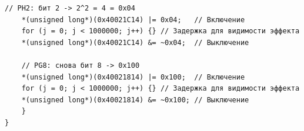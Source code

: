 \begin{lstlisting}[style=cstyle, caption={Основная функция программы}]
    // PH2: бит 2 -> 2^2 = 4 = 0x04
    *(unsigned long*)(0x40021C14) |= 0x04;   // Включение
    for (j = 0; j < 1000000; j++) {} // Задержка для видимости эффекта
    *(unsigned long*)(0x40021C14) &= ~0x04;  // Выключение

    // PG8: снова бит 8 -> 0x100
    *(unsigned long*)(0x40021814) |= 0x100;  // Включение
    for (j = 0; j < 1000000; j++) {} // Задержка для видимости эффекта
    *(unsigned long*)(0x40021814) &= ~0x100; // Выключение
	}
}
\end{lstlisting}

\newpage